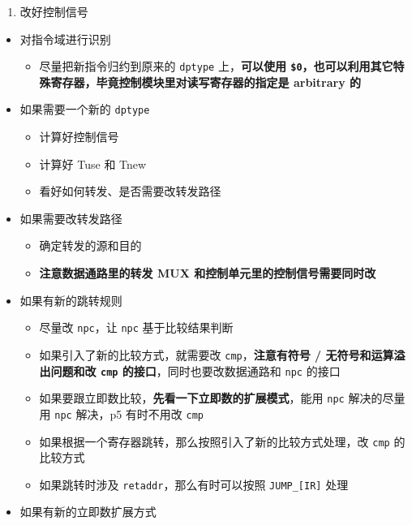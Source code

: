 \documentclass[12pt,AutoFakeBold,AutoFakeSlant]{article}
\providecommand{\tightlist}{%
  \setlength{\itemsep}{0pt}\setlength{\parskip}{0pt}}
\begin{document}
\begin{enumerate}
\def\labelenumi{\arabic{enumi}.}
\setcounter{enumi}{2}
\tightlist
\item
  改好控制信号
\end{enumerate}

\begin{itemize}
\tightlist
\item
  对指令域进行识别

  \begin{itemize}
  \tightlist
  \item
    尽量把新指令归约到原来的 \texttt{dptype} 上，\textbf{可以使用
    \texttt{\$0}，也可以利用其它特殊寄存器，毕竟控制模块里对读写寄存器的指定是
    arbitrary 的}
  \end{itemize}
\item
  如果需要一个新的 \texttt{dptype}

  \begin{itemize}
  \tightlist
  \item
    计算好控制信号
  \item
    计算好 Tuse 和 Tnew
  \item
    看好如何转发、是否需要改转发路径
  \end{itemize}
\item
  如果需要改转发路径

  \begin{itemize}
  \tightlist
  \item
    确定转发的源和目的
  \item
    \textbf{注意数据通路里的转发 MUX 和控制单元里的控制信号需要同时改}
  \end{itemize}
\item
  如果有新的跳转规则

  \begin{itemize}
  \tightlist
  \item
    尽量改 \texttt{npc}，让 \texttt{npc} 基于比较结果判断
  \item
    如果引入了新的比较方式，就需要改 \texttt{cmp}，\textbf{注意有符号 /
    无符号和运算溢出问题和改 \texttt{cmp} 的接口}，同时也要改数据通路和
    \texttt{npc} 的接口
  \item
    如果要跟立即数比较，\textbf{先看一下立即数的扩展模式}，能用
    \texttt{npc} 解决的尽量用 \texttt{npc} 解决，p5 有时不用改
    \texttt{cmp}
  \item
    如果根据一个寄存器跳转，那么按照引入了新的比较方式处理，改
    \texttt{cmp} 的比较方式
  \item
    如果跳转时涉及 \texttt{retaddr}，那么有时可以按照
    \texttt{JUMP\_{[}IR{]}} 处理
  \end{itemize}
\item
  如果有新的立即数扩展方式


\end{itemize}
\end{document}
